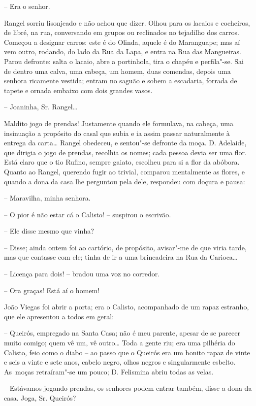 -- Era o senhor.

Rangel sorriu lisonjeado e não achou que dizer. Olhou para os lacaios e
cocheiros, de libré, na rua, conversando em grupos ou reclinados no
tejadilho dos carros. Começou a designar carros: este é do Olinda,
aquele é do Maranguape; mas aí vem outro, rodando, do lado da Rua da
Lapa, e entra na Rua das Mangueiras. Parou defronte: salta o lacaio,
abre a portinhola, tira o chapéu e perfila"-se. Sai de dentro uma calva,
uma cabeça, um homem, duas comendas, depois uma senhora ricamente
vestida; entram no saguão e sobem a escadaria, forrada de tapete e
ornada embaixo com dois grandes vasos.

-- Joaninha, Sr. Rangel\ldots{}

Maldito jogo de prendas! Justamente quando ele formulava, na cabeça, uma
insinuação a propósito do casal que subia e ia assim passar naturalmente
à entrega da carta\ldots{} Rangel obedeceu, e sentou"-se defronte da moça. D.
Adelaide, que dirigia o jogo de prendas, recolhia os nomes; cada pessoa
devia ser uma flor. Está claro que o tio Rufino, sempre gaiato, escolheu
para si a flor da abóbora. Quanto ao Rangel, querendo fugir ao trivial,
comparou mentalmente as flores, e quando a dona da casa lhe perguntou
pela dele, respondeu com doçura e pausa:

-- Maravilha, minha senhora.

-- O pior é não estar cá o Calisto! -- suspirou o escrivão.

-- Ele disse mesmo que vinha?

-- Disse; ainda ontem foi ao cartório, de propósito, avisar"-me de que
viria tarde, mas que contasse com ele; tinha de ir a uma brincadeira na
Rua da Carioca\ldots{}

-- Licença para dois! -- bradou uma voz no corredor.

-- Ora graças! Está aí o homem!

João Viegas foi abrir a porta; era o Calisto, acompanhado de um rapaz
estranho, que ele apresentou a todos em geral:

-- Queirós, empregado na Santa Casa; não é meu parente, apesar de se
parecer muito comigo; quem vê um, vê outro\ldots{} Toda a gente riu; era uma
pilhéria do Calisto, feio como o diabo -- ao passo que o Queirós era um
bonito rapaz de vinte e seis a vinte e sete anos, cabelo negro, olhos
negros e singularmente esbelto. As~moças retraíram"-se um pouco; D.
Felismina abriu todas as velas.

-- Estávamos jogando prendas, os senhores podem entrar também, disse a
dona da casa. Joga, Sr. Queirós?

